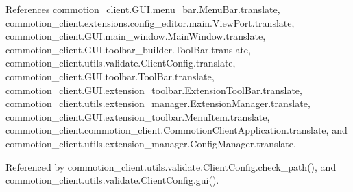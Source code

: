 References commotion\-\_\-client.\-G\-U\-I.\-menu\-\_\-bar.\-Menu\-Bar.\-translate, commotion\-\_\-client.\-extensions.\-config\-\_\-editor.\-main.\-View\-Port.\-translate, commotion\-\_\-client.\-G\-U\-I.\-main\-\_\-window.\-Main\-Window.\-translate, commotion\-\_\-client.\-G\-U\-I.\-toolbar\-\_\-builder.\-Tool\-Bar.\-translate, commotion\-\_\-client.\-utils.\-validate.\-Client\-Config.\-translate, commotion\-\_\-client.\-G\-U\-I.\-toolbar.\-Tool\-Bar.\-translate, commotion\-\_\-client.\-G\-U\-I.\-extension\-\_\-toolbar.\-Extension\-Tool\-Bar.\-translate, commotion\-\_\-client.\-utils.\-extension\-\_\-manager.\-Extension\-Manager.\-translate, commotion\-\_\-client.\-G\-U\-I.\-extension\-\_\-toolbar.\-Menu\-Item.\-translate, commotion\-\_\-client.\-commotion\-\_\-client.\-Commotion\-Client\-Application.\-translate, and commotion\-\_\-client.\-utils.\-extension\-\_\-manager.\-Config\-Manager.\-translate.



Referenced by commotion\-\_\-client.\-utils.\-validate.\-Client\-Config.\-check\-\_\-path(), and commotion\-\_\-client.\-utils.\-validate.\-Client\-Config.\-gui().


